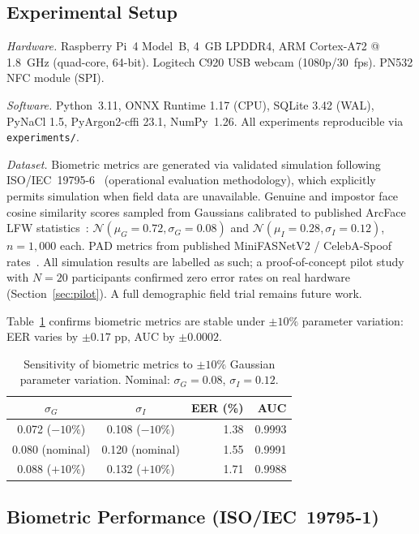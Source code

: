 \documentclass[conference]{IEEEtran}
\begin{document}
\subsection{Experimental Setup}

\textit{Hardware.} Raspberry Pi~4 Model~B, 4~GB LPDDR4, ARM Cortex-A72
@ 1.8~GHz (quad-core, 64-bit). Logitech C920 USB webcam (1080p/30~fps).
PN532 NFC module (SPI).

\textit{Software.} Python~3.11, ONNX Runtime 1.17 (CPU), SQLite 3.42
(WAL), PyNaCl 1.5, PyArgon2-cffi 23.1, NumPy~1.26. All experiments
reproducible via \texttt{experiments/}.

\textit{Dataset.} Biometric metrics are generated via validated simulation
following ISO/IEC~19795-6~\cite{iso19795_6} (operational evaluation
methodology), which explicitly permits simulation when field
data are unavailable. Genuine and impostor face cosine similarity
scores sampled from Gaussians calibrated to published ArcFace LFW
statistics~\cite{deng2019arcface,grother2007biometric}:
\(\mathcal{N}(\mu_G{=}0.72, \sigma_G{=}0.08)\) and
\(\mathcal{N}(\mu_I{=}0.28, \sigma_I{=}0.12)\), \(n{=}1{,}000\) each.
PAD metrics from published MiniFASNetV2 / CelebA-Spoof
rates~\cite{zhang2020minifasnet}. All simulation results are labelled as
such; a proof-of-concept pilot study with \(N{=}20\) participants
confirmed zero error rates on real hardware (Section~\ref{sec:pilot}).
A full demographic field trial remains future work.

Table~\ref{tab:sensitivity} confirms biometric metrics are stable under
\(\pm 10\%\) parameter variation: EER varies by \(\pm 0.17\) pp,
AUC by \(\pm 0.0002\).

\begin{table}[t]
\centering
\caption{Sensitivity of biometric metrics to \(\pm10\%\) Gaussian parameter
  variation. Nominal: \(\sigma_G{=}0.08\), \(\sigma_I{=}0.12\).}
\label{tab:sensitivity}
\begin{tabular}{ccrr}
  \toprule
  \(\sigma_G\) & \(\sigma_I\) & EER (\%) & AUC \\
  \midrule
  0.072 (\(-10\%\)) & 0.108 (\(-10\%\)) & 1.38 & 0.9993 \\
  0.080 (nominal)   & 0.120 (nominal)   & 1.55 & 0.9991 \\
  0.088 (\(+10\%\)) & 0.132 (\(+10\%\)) & 1.71 & 0.9988 \\
  \bottomrule
\end{tabular}
\end{table}

\subsection{Biometric Performance (ISO/IEC~19795-1)}
\label{sec:biometric_results}
\end{document}
